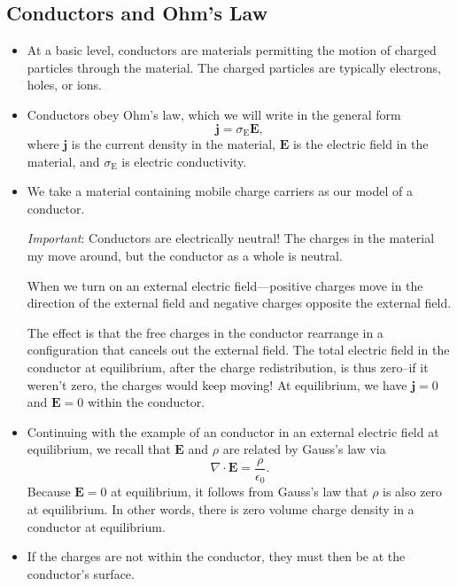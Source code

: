 \documentclass[11pt, a4paper]{article}
\renewcommand{\vec}[1]{\bm{#1}} %
\newcommand{\E}{\vec{E}} %
\newcommand{\ee}{\epsilon_{0}}  %
\renewcommand{\j}{\vec{j}}  %
\renewcommand{\div}{\nabla \cdot}
\begin{document}
\subsection{Conductors and Ohm's Law}
\begin{itemize}
	\item At a basic level, conductors are materials permitting the motion of charged particles through the material. The charged particles are typically electrons, holes, or ions.
	
	\item Conductors obey Ohm's law, which we will write in the general form
	\begin{equation*}
		\j = \sigma_{\mathrm{E}} \E,
	\end{equation*}
	where $ \j $ is the current density in the material, $ \E $ is the electric field in the material, and $ \sigma_{\mathrm{E}} $ is electric conductivity.
	
	\item We take a material containing mobile charge carriers as our model of a conductor. 

    \textit{Important}: Conductors are electrically neutral! The charges in the material my move around, but the conductor as a whole is neutral.
	
	When we turn on an external electric field---positive charges move in the direction of the external field and negative charges opposite the external field. 
	
	The effect is that the free charges in the conductor rearrange in a configuration that cancels out the external field. The total electric field in the conductor at equilibrium, after the charge redistribution, is thus zero--if it weren't zero, the charges would keep moving! At equilibrium, we have $ \j = 0 $ and $ \E = 0 $ within the conductor.
	
	\item Continuing with the example of an conductor in an external electric field at equilibrium, we recall that $ \E $ and $ \rho $ are related by Gauss's law via
	\begin{equation*}
		\div \E = \frac{\rho}{\ee}.
	\end{equation*}
	Because $ \E = 0 $ at equilibrium, it follows from Gauss's law that $ \rho $ is also zero at equilibrium. In other words, there is zero volume charge density in a conductor at equilibrium.
	
	\item If the charges are not within the conductor, they must then be at the conductor's surface. 


\end{itemize}
\end{document}
